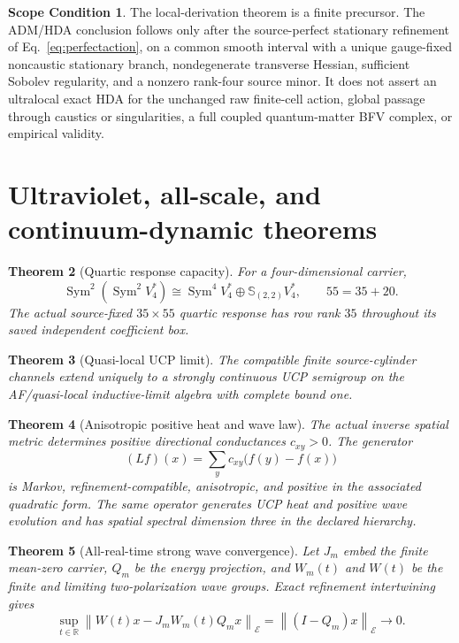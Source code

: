 \documentclass[11pt]{article}
\newtheorem{theorem}{Theorem}[section]
\theoremstyle{definition}
\newtheorem{scope}[theorem]{Scope Condition}
\theoremstyle{remark}
\newcommand{\Sym}{\operatorname{Sym}}
\newcommand{\cE}{\mathcal E}
\begin{document}
\begin{scope}
The local-derivation theorem is a finite precursor. The ADM/HDA conclusion follows only after the source-perfect stationary refinement of Eq.~\eqref{eq:perfectaction}, on a common smooth interval with a unique gauge-fixed noncaustic stationary branch, nondegenerate transverse Hessian, sufficient Sobolev regularity, and a nonzero rank-four source minor. It does not assert an ultralocal exact HDA for the unchanged raw finite-cell action, global passage through caustics or singularities, a full coupled quantum-matter BFV complex, or empirical validity.
\end{scope}

\section{Ultraviolet, all-scale, and continuum-dynamic theorems}

\begin{theorem}[Quartic response capacity]
For a four-dimensional carrier,
\begin{equation}
\Sym^2(\Sym^2V_4^*)
\cong\Sym^4V_4^*\oplus\mathbb S_{(2,2)}V_4^*,
\qquad 55=35+20.
\label{eq:quarticdecomp}
\end{equation}
The actual source-fixed $35\times55$ quartic response has row rank $35$ throughout its saved independent coefficient box.
\end{theorem}

\begin{theorem}[Quasi-local UCP limit]
The compatible finite source-cylinder channels extend uniquely to a strongly continuous UCP semigroup on the AF/quasi-local inductive-limit algebra with complete bound one.
\end{theorem}

\begin{theorem}[Anisotropic positive heat and wave law]
The actual inverse spatial metric determines positive directional conductances $c_{xy}>0$. The generator
\begin{equation}
(Lf)(x)=\sum_yc_{xy}\bigl(f(y)-f(x)\bigr)
\label{eq:conductance}
\end{equation}
is Markov, refinement-compatible, anisotropic, and positive in the associated quadratic form. The same operator generates UCP heat and positive wave evolution and has spatial spectral dimension three in the declared hierarchy.
\end{theorem}

\begin{theorem}[All-real-time strong wave convergence]
Let $J_m$ embed the finite mean-zero carrier, $Q_m$ be the energy projection, and $W_m(t)$ and $W(t)$ be the finite and limiting two-polarization wave groups. Exact refinement intertwining gives
\begin{equation}
\sup_{t\in\mathbb R}
\left\|W(t)x-J_mW_m(t)Q_mx\right\|_{\cE}
=\left\|(I-Q_m)x\right\|_{\cE}
\longrightarrow0.
\label{eq:strongwave}
\end{equation}
\end{theorem}
\end{document}
